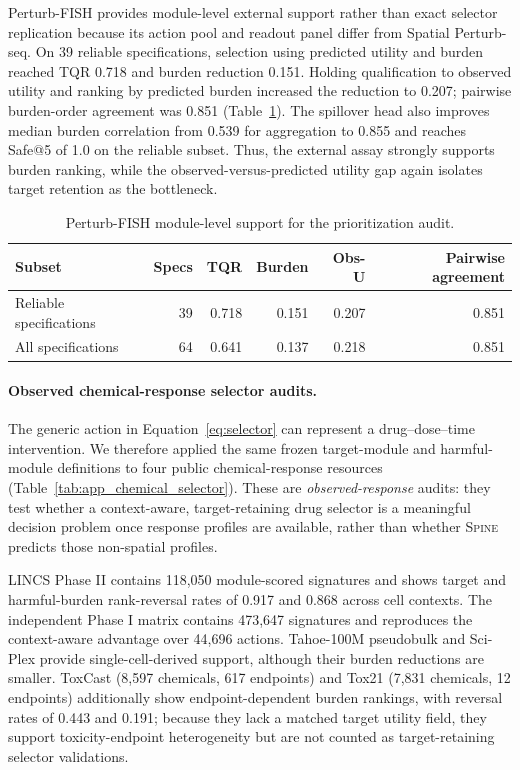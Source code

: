 \documentclass[sigconf,review,balance=false]{acmart}
\newcommand{\methodname}{\textsc{Spine}\xspace}
\begin{document}
Perturb-FISH provides module-level external support rather than exact selector
replication because its action pool and readout panel differ from Spatial
Perturb-seq. On 39 reliable specifications, selection using predicted utility
and burden reached TQR 0.718 and burden reduction 0.151. Holding qualification
to observed utility and ranking by predicted burden increased the reduction to
0.207; pairwise burden-order agreement was 0.851
(Table~\ref{tab:app_selector_perturb_fish}). The spillover head also improves
median burden correlation from 0.539 for aggregation to 0.855 and reaches
Safe@5 of 1.0 on the reliable subset. Thus, the external assay strongly
supports burden ranking, while the observed-versus-predicted utility gap again
isolates target retention as the bottleneck.

\begin{table}[t]
\centering
\scriptsize
\caption{Perturb-FISH module-level support for the prioritization audit.}
\label{tab:app_selector_perturb_fish}
\setlength{\tabcolsep}{3pt}
\begin{tabular}{@{}lrrrrr@{}}
\toprule
Subset & Specs & TQR & Burden & Obs-U & Pairwise agreement \\
\midrule
Reliable specifications & 39 & 0.718 & 0.151 & 0.207 & 0.851 \\
All specifications & 64 & 0.641 & 0.137 & 0.218 & 0.851 \\
\bottomrule
\end{tabular}
\end{table}

\paragraph{Observed chemical-response selector audits.}
The generic action in Equation~\ref{eq:selector} can represent a
drug--dose--time intervention. We therefore applied the same frozen
target-module and harmful-module definitions to four public chemical-response
resources (Table~\ref{tab:app_chemical_selector}). These are
\emph{observed-response} audits: they test whether a context-aware,
target-retaining drug selector is a meaningful decision problem once response
profiles are available, rather than whether \methodname{} predicts those
non-spatial profiles.

LINCS Phase II contains 118,050 module-scored signatures and shows target and
harmful-burden rank-reversal rates of 0.917 and 0.868 across cell contexts.
The independent Phase I matrix contains 473,647 signatures and reproduces the
context-aware advantage over 44,696 actions. Tahoe-100M pseudobulk and
Sci-Plex provide single-cell-derived support, although their burden reductions
are smaller. ToxCast (8,597 chemicals, 617 endpoints) and Tox21 (7,831
chemicals, 12 endpoints) additionally show endpoint-dependent burden rankings,
with reversal rates of 0.443 and 0.191; because they lack a matched target
utility field, they support toxicity-endpoint heterogeneity but are not counted
as target-retaining selector validations.
\end{document}
